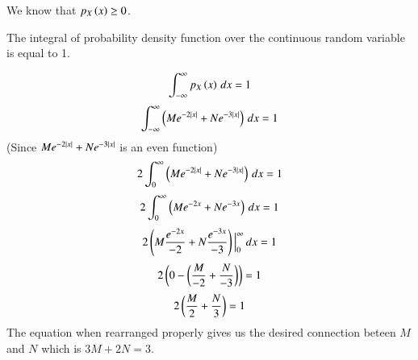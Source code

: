 We know that $p_{X}\left(x\right) \geq 0$.
\begin{theorem}
The integral of probability density function over the continuous random variable is equal to 1.
\end{theorem}
\begin{align}
\int_{-\infty}^{\infty}p_{X}\left(x\right)\,dx=1
\end{align}
\begin{align}
\int_{-\infty}^{\infty}\left(Me^{-2\left\vert x\right\vert}+Ne^{-3\left\vert x\right\vert}\right)\,dx=1
\end{align}
(Since $Me^{-2\left\vert x\right\vert}+Ne^{-3\left\vert x\right\vert}$ is an even function)
\begin{align}
2\int_{0}^{\infty}\left(Me^{-2\left\vert x\right\vert}+Ne^{-3\left\vert x\right\vert}\right)\,dx=1 
\end{align}
\begin{align}
2\int_{0}^{\infty}\left(Me^{-2x}+Ne^{-3x}\right)\,dx=1
\end{align}
\begin{align}
2\left(M\frac{e^{-2x}}{-2}+N\frac{e^{-3x}}{-3}\right)\Big|_{0}^{\infty}\,dx=1
\end{align}
\begin{align}
2\left(0-\left(\frac{M}{-2}+\frac{N}{-3}\right)\right)=1
\end{align}
\begin{align}
2\left(\frac{M}{2}+\frac{N}{3}\right)=1
\end{align}
%
The equation when rearranged properly gives us the desired connection beteen $M$ and $N$ which is
$3M+2N=3$.